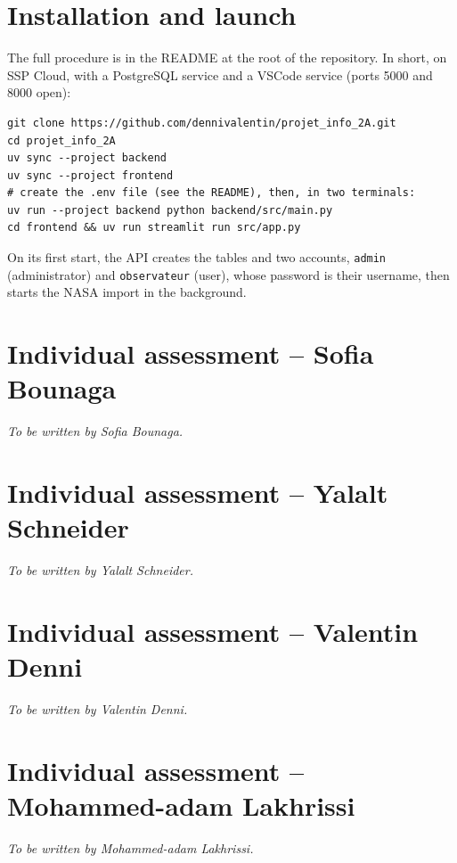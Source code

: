 \section{Installation and launch}

The full procedure is in the README at the root of the repository. In short, on SSP Cloud, with a
PostgreSQL service and a VSCode service (ports 5000 and 8000 open):

\begin{lstlisting}
git clone https://github.com/dennivalentin/projet_info_2A.git
cd projet_info_2A
uv sync --project backend
uv sync --project frontend
# create the .env file (see the README), then, in two terminals:
uv run --project backend python backend/src/main.py
cd frontend && uv run streamlit run src/app.py
\end{lstlisting}

On its first start, the API creates the tables and two accounts, \texttt{admin} (administrator)
and \texttt{observateur} (user), whose password is their username, then starts the NASA import in
the background.


\section{Individual assessment -- Sofia Bounaga}

\textit{To be written by Sofia Bounaga.}

\section{Individual assessment -- Yalalt Schneider}

\textit{To be written by Yalalt Schneider.}

\section{Individual assessment -- Valentin Denni}

\textit{To be written by Valentin Denni.}

\section{Individual assessment -- Mohammed-adam Lakhrissi}

\textit{To be written by Mohammed-adam Lakhrissi.}
